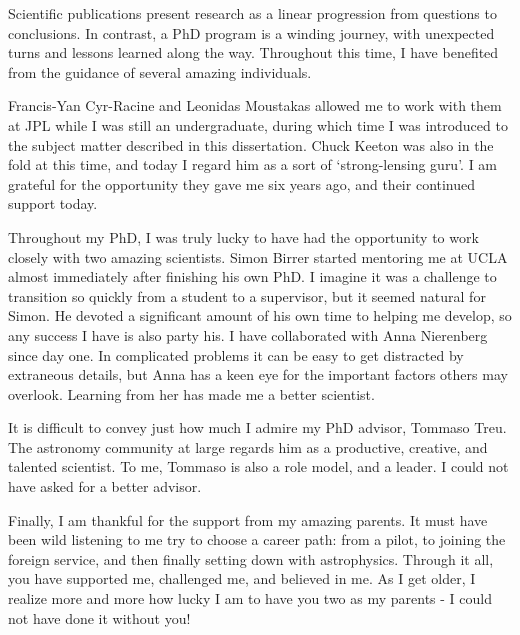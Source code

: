 {\indent Scientific publications present research as a linear progression from questions to conclusions. In contrast, a PhD program is a winding journey, with unexpected turns and lessons learned along the way. Throughout this time, I have benefited from the guidance of several amazing individuals. 
	
Francis-Yan Cyr-Racine and Leonidas Moustakas allowed me to work with them at JPL while I was still an undergraduate, during which time I was introduced to the subject matter described in this dissertation. Chuck Keeton was also in the fold at this time, and today I regard him as a sort of `strong-lensing guru'. I am grateful for the opportunity they gave me six years ago, and their continued support today. 

Throughout my PhD, I was truly lucky to have had the opportunity to work closely with two amazing scientists. Simon Birrer started mentoring me at UCLA almost immediately after finishing his own PhD. I imagine it was a challenge to transition so quickly from a student to a supervisor, but it seemed natural for Simon. He devoted a significant amount of his own time to helping me develop, so any success I have is also party his. I have collaborated with Anna Nierenberg since day one. In complicated problems it can be easy to get distracted by extraneous details, but Anna has a keen eye for the important factors others may overlook. Learning from her has made me a better scientist. 

It is difficult to convey just how much I admire my PhD advisor, Tommaso Treu. The astronomy community at large regards him as a productive, creative, and talented scientist. To me, Tommaso is also a role model, and a leader. I could not have asked for a better advisor.  

Finally, I am thankful for the support from my amazing parents. It must have been wild listening to me try to choose a career path: from a pilot, to joining the foreign service, and then finally setting down with astrophysics. Through it all, you have supported me, challenged me, and believed in me. As I get older, I realize more and more how lucky I am to have you two as my parents - I could not have done it without you! 
}